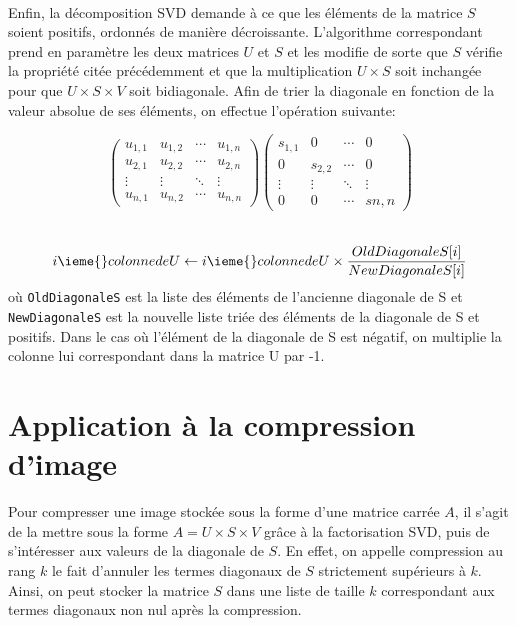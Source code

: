 \documentclass{article}
\begin{document}
\paragraph{}
Enfin, la décomposition SVD demande à ce que les éléments de la matrice $S$ soient positifs, ordonnés de manière décroissante. L'algorithme correspondant prend en paramètre les deux matrices $U$ et $S$ et les modifie de sorte que $S$ vérifie la propriété citée précédemment et que la multiplication $U\times S$ soit inchangée pour que $U\times S\times V$ soit bidiagonale. Afin de trier la diagonale en fonction de la valeur absolue de ses éléments, on effectue l'opération suivante:
\begin{center}
    \[\begin{pmatrix}
        u_{1,1} & u_{1,2} & \cdots & u_{1,n} \\
        u_{2,1} & u_{2,2} & \cdots & u_{2,n} \\
        \vdots & \vdots & \ddots & \vdots \\
        u_{n,1} & u_{n,2} & \cdots & u_{n,n}
    \end{pmatrix}
    \begin{pmatrix}
        s_{1,1} & 0 & \cdots & 0 \\
        0 & s_{2,2} & \cdots & 0 \\
        \vdots & \vdots & \ddots & \vdots \\
        0 & 0 & \cdots & s{n,n}
    \end{pmatrix}\]\\
\end{center}

\begin{equation}
    i\ieme{} colonne de U \gets i\ieme{} colonne de U \times \frac{OldDiagonaleS[i]}{NewDiagonaleS[i]}
\end{equation}
où \texttt{OldDiagonaleS} est la liste des éléments de l'ancienne diagonale de S et \texttt{NewDiagonaleS} est la nouvelle liste triée des éléments de la diagonale de S et positifs. Dans le cas où l'élément de la diagonale de S est négatif, on multiplie la colonne lui correspondant dans la matrice U par -1.



\section{Application à la compression d'image}

Pour compresser une image stockée sous la forme d'une matrice carrée $A$, il s'agit de la mettre sous la forme $A = U \times S \times V$ grâce à la factorisation SVD, puis de s'intéresser aux valeurs de la diagonale de $S$. En effet, on appelle compression au rang $k$ le fait d'annuler les termes diagonaux de $S$ strictement supérieurs à $k$. Ainsi, on peut stocker la matrice $S$ dans une liste de taille $k$ correspondant aux termes diagonaux non nul après la compression.
\end{document}
